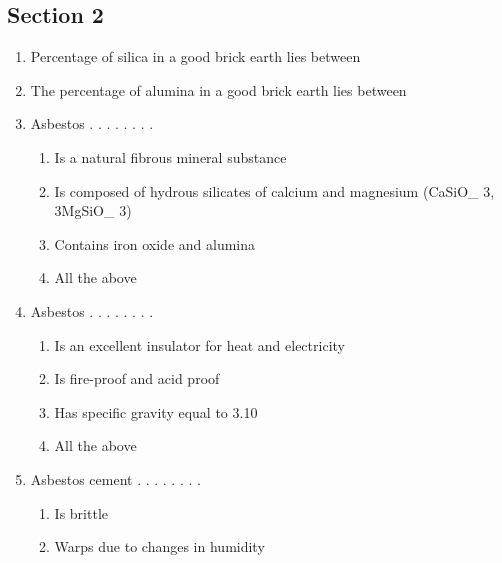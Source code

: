 \documentclass[11pt,a4paper]{article}
\begin{document}
\subsection*{Section 2}
\begin{enumerate}
\item{Percentage of silica in a good brick earth lies between}
\\
\item{The percentage of alumina in a good brick earth lies between}
\\
\item{Asbestos . . . . . . . .}
\begin{enumerate}[label=\Alph*.]
\item{Is a natural fibrous mineral substance}
\item{Is composed of hydrous silicates of calcium and magnesium (CaSiO\_ 3, 3MgSiO\_ 3)}
\item{Contains iron oxide and alumina}
\item{All the above}
\end{enumerate}
\item{Asbestos . . . . . . . .}
\begin{enumerate}[label=\Alph*.]
\item{Is an excellent insulator for heat and electricity}
\item{Is fire-proof and acid proof}
\item{Has specific gravity equal to 3.10}
\item{All the above}
\end{enumerate}
\item{Asbestos cement . . . . . . . .}
\begin{enumerate}[label=\Alph*.]
\item{Is brittle}
\item{Warps due to changes in humidity}

\end{enumerate}
\end{enumerate}
\end{document}
